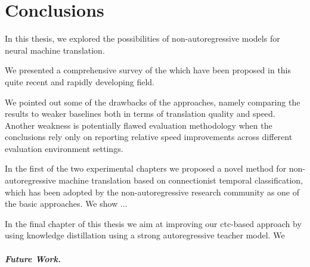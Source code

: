 \chapter{Conclusions}
\label{chap:conclusions}

In this thesis, we explored the possibilities of non-autoregressive models for
neural machine translation.

We presented a comprehensive survey of the  which have been proposed in this quite recent and rapidly
developing field. 

We pointed out some of the drawbacks of the approaches, namely  comparing the results to weaker baselines both in terms of translation
quality and speed. Another weakness is potentially flawed evaluation
methodology when the conclusions rely only on reporting relative speed
improvements across different evaluation environment settings.

In the first of the two experimental chapters  we proposed a
novel method for non-autoregressive machine translation based on connectionist
temporal classification, which has been adopted by the non-autoregressive
research community as one of the basic approaches. We show ...

In the final chapter of this thesis we aim at improving our ctc-based approach
by using knowledge distillation using a strong autoregressive teacher model.
We 

\paragraph{Future Work.}

